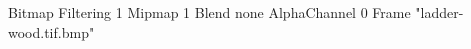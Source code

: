 {Bitmap
	{Filtering 1}
	{Mipmap 1}
	{Blend none}
	{AlphaChannel 0}
	{Frame "ladder-wood.tif.bmp"}
}
